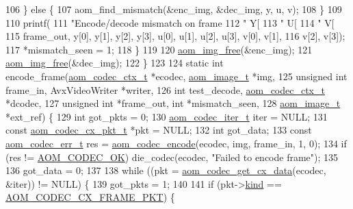 \begin{DoxyCodeInclude}
{106     \} \textcolor{keywordflow}{else} \{
107       aom\_find\_mismatch(&enc\_img, &dec\_img, y, u, v);
108     \}
109 
110     printf(
111         \textcolor{stringliteral}{"Encode/decode mismatch on frame %
112         \textcolor{stringliteral}{" Y[%
113         \textcolor{stringliteral}{" U[%
114         \textcolor{stringliteral}{" V[%
115         frame\_out, y[0], y[1], y[2], y[3], u[0], u[1], u[2], u[3], v[0], v[1],
116         v[2], v[3]);
117     *mismatch\_seen = 1;
118   \}
119 
120   \hyperlink{aom__image_8h_afff22f7f3eb9409c5b678d1962f110a8}{aom\_img\_free}(&enc\_img);
121   \hyperlink{aom__image_8h_afff22f7f3eb9409c5b678d1962f110a8}{aom\_img\_free}(&dec\_img);
122 \}
123 
124 \textcolor{keyword}{static} \textcolor{keywordtype}{int} encode\_frame(\hyperlink{structaom__codec__ctx}{aom\_codec\_ctx\_t} *ecodec, \hyperlink{structaom__image}{aom\_image\_t} *img,
125                         \textcolor{keywordtype}{unsigned} \textcolor{keywordtype}{int} frame\_in, AvxVideoWriter *writer,
126                         \textcolor{keywordtype}{int} test\_decode, \hyperlink{structaom__codec__ctx}{aom\_codec\_ctx\_t} *dcodec,
127                         \textcolor{keywordtype}{unsigned} \textcolor{keywordtype}{int} *frame\_out, \textcolor{keywordtype}{int} *mismatch\_seen,
128                         \hyperlink{structaom__image}{aom\_image\_t} *ext\_ref) \{
129   \textcolor{keywordtype}{int} got\_pkts = 0;
130   \hyperlink{group__codec_gadf9e173c9e02788a9999399edab20a02}{aom\_codec\_iter\_t} iter = NULL;
131   \textcolor{keyword}{const} \hyperlink{structaom__codec__cx__pkt}{aom\_codec\_cx\_pkt\_t} *pkt = NULL;
132   \textcolor{keywordtype}{int} got\_data;
133   \textcolor{keyword}{const} \hyperlink{group__codec_gaaae61e0f8663e6137f1e228757248e7c}{aom\_codec\_err\_t} res = \hyperlink{group__encoder_ga6f4a777de5389771e783df7ff1f116d4}{aom\_codec\_encode}(ecodec, img, frame\_in, 1, 0);
134   \textcolor{keywordflow}{if} (res != \hyperlink{group__codec_ggaaae61e0f8663e6137f1e228757248e7caf145dc2f86014a08ebad36ac2b140001}{AOM\_CODEC\_OK}) die\_codec(ecodec, \textcolor{stringliteral}{"Failed to encode frame"});
135 
136   got\_data = 0;
137 
138   \textcolor{keywordflow}{while} ((pkt = \hyperlink{group__encoder_gaedc4c56b60d4217677cb561066360884}{aom\_codec\_get\_cx\_data}(ecodec, &iter)) != NULL) \{
139     got\_pkts = 1;
140 
141     \textcolor{keywordflow}{if} (pkt->\hyperlink{structaom__codec__cx__pkt_a11e586120c689ece9a7690e72ff384be}{kind} == \hyperlink{group__encoder_ggafeb69da4a9649a54e805f59c26d8dfeda793165d0f219812342f69d5fd9b2b9c8}{AOM\_CODEC\_CX\_FRAME\_PKT}) \{
}}}}}
\end{DoxyCodeInclude}
